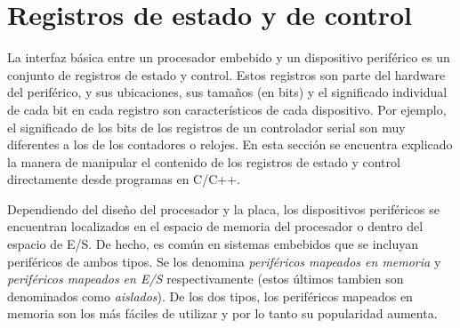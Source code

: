 \documentclass[output=paper, 
colorlinks,
citecolor=brown,
newtxmath
]{langscibook}
\begin{document}

\def\maketitle{

 \makeatletter
 {\color{bl} \centering \huge \sc \textbf{
\large \vspace*{-8pt} \color{black} Programación de Sistemas Embebidos
 \vspace*{8pt} }\par}
 \makeatother


 \makeatletter
 {\centering \small 
 	Departamento de Ingeniería de Computadoras \\
 	Facultad de Informática - Universidad Nacional del Comahue \\
 	\vspace{20pt} }
 \makeatother

}








\section {Registros de estado y de control}

La interfaz básica entre un procesador embebido y un dispositivo periférico
es un conjunto de registros de estado y control. Estos registros son parte
del hardware del periférico, y sus ubicaciones, sus tamaños (en bits) y el
significado individual de cada bit en cada registro son característicos 
de cada dispositivo. Por ejemplo, 
el significado de los bits de los registros de un controlador serial son 
muy diferentes a los
de los contadores o relojes. En esta sección se encuentra explicado la 
manera de manipular el contenido de los registros de estado y control
directamente desde programas en C/C++.

Dependiendo del diseño del procesador y la placa, los dispositivos periféricos
se encuentran localizados en el espacio de memoria del procesador o dentro
del espacio de E/S. De hecho, es común en sistemas embebidos que se incluyan
periféricos de ambos tipos. Se los denomina \textit{periféricos mapeados en memoria}
y \textit{periféricos mapeados en E/S} respectivamente (estos últimos tambien son 
denominados como \textit{aislados}). De los dos tipos, los periféricos
mapeados en memoria son los más fáciles de utilizar y por lo tanto su popularidad
aumenta.
\end{document}
